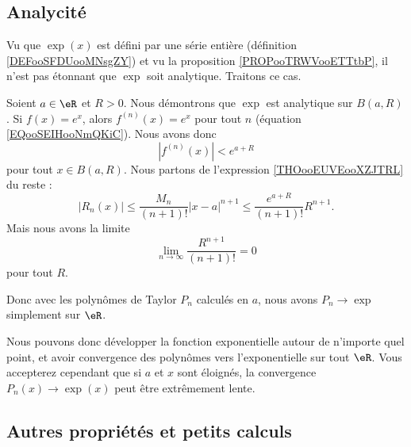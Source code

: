 	\subsection{Analycité}

	Vu que \( \exp(x)\) est défini par une série entière (définition \ref{DEFooSFDUooMNsgZY}) et vu la proposition \ref{PROPooTRWVooETTtbP}, il n'est pas étonnant que \( \exp\) soit analytique. Traitons ce cas.

	\begin{example}
		Soient \( a\in \eR\) et \( R>0\). Nous démontrons que \( \exp\) est analytique sur \( B(a,R)\). Si \( f(x)= e^{x}\), alors \( f^{(n)}(x)= e^{x}\) pour tout \( n\) (équation \eqref{EQooSEIHooNmQKiC}). Nous avons donc
		\begin{equation}
			| f^{(n)}(x) |< e^{a+R}
		\end{equation}
		pour tout \( x\in B(a,R)\). Nous partons de l'expression \eqref{THOooEUVEooXZJTRL} du reste :
		\begin{equation}
			| R_n(x) |\leq \frac{ M_n }{ (n+1)! }| x-a |^{n+1}\leq \frac{  e^{a+R} }{ (n+1)! }R^{n+1}.
		\end{equation}
		Mais nous avons la limite
		\begin{equation}
			\lim_{n\to \infty} \frac{ R^{n+1} }{ (n+1)! }=0
		\end{equation}
		pour tout \( R\).

		Donc avec les polynômes de Taylor \( P_n\) calculés en \( a\), nous avons \( P_n\to \exp\) simplement sur \( \eR\).

		Nous pouvons donc développer la fonction exponentielle autour de n'importe quel point, et avoir convergence des polynômes vers l'exponentielle sur tout \( \eR\). Vous accepterez cependant que si \( a\) et \( x\) sont éloignés, la convergence \( P_n(x)\to \exp(x)\) peut être extrêmement lente.
	\end{example}

	\subsection{Autres propriétés et petits calculs}

